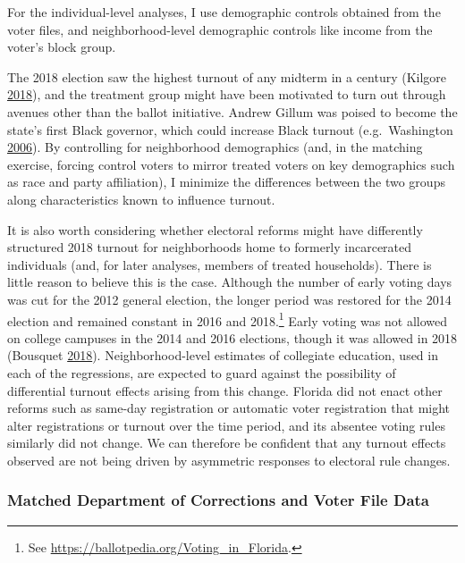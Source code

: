 \documentclass[
  12pt,
]{article}
\begin{document}
For the individual-level analyses, I use demographic controls obtained from the voter files, and neighborhood-level demographic controls like income from the voter's block group.

The 2018 election saw the highest turnout of any midterm in a century (Kilgore \protect\hyperlink{ref-Kilgore2018}{2018}), and the treatment group might have been motivated to turn out through avenues other than the ballot initiative. Andrew Gillum was poised to become the state's first Black governor, which could increase Black turnout (e.g.~Washington \protect\hyperlink{ref-Washington2006}{2006}). By controlling for neighborhood demographics (and, in the matching exercise, forcing control voters to mirror treated voters on key demographics such as race and party affiliation), I minimize the differences between the two groups along characteristics known to influence turnout.

It is also worth considering whether electoral reforms might have differently structured 2018 turnout for neighborhoods home to formerly incarcerated individuals (and, for later analyses, members of treated households). There is little reason to believe this is the case. Although the number of early voting days was cut for the 2012 general election, the longer period was restored for the 2014 election and remained constant in 2016 and 2018.\footnote{See \url{https://ballotpedia.org/Voting_in_Florida}.} Early voting was not allowed on college campuses in the 2014 and 2016 elections, though it was allowed in 2018 (Bousquet \protect\hyperlink{ref-Bousquet2018a}{2018}). Neighborhood-level estimates of collegiate education, used in each of the regressions, are expected to guard against the possibility of differential turnout effects arising from this change. Florida did not enact other reforms such as same-day registration or automatic voter registration that might alter registrations or turnout over the time period, and its absentee voting rules similarly did not change. We can therefore be confident that any turnout effects observed are not being driven by asymmetric responses to electoral rule changes.

\hypertarget{matched-department-of-corrections-and-voter-file-data}{%
\subsubsection*{Matched Department of Corrections and Voter File Data}\label{matched-department-of-corrections-and-voter-file-data}}
\end{document}
